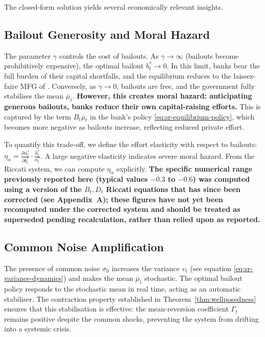 The closed-form solution yields several economically relevant insights.

\subsection{Bailout Generosity and Moral Hazard}

The parameter $\gamma$ controls the cost of bailouts. As $\gamma \to \infty$
(bailouts become prohibitively expensive), the optimal bailout $b_t^* \to 0$. In
this limit, banks bear the full burden of their capital shortfalls, and the
equilibrium reduces to the laissez-faire MFG of \citep{carmonafouquesun2015}.
Conversely, as $\gamma \to 0$, bailouts are free, and the government fully
stabilises the mean $\bar\mu_t$. \textbf{However, this creates moral hazard:
anticipating generous bailouts, banks reduce their own capital-raising efforts.}
This is captured by the term $B_t \bar\mu_t$ in the bank's policy
\eqref{eq:sr-equilibrium-policy}, which becomes more negative as bailouts increase,
reflecting reduced private effort.

To quantify this trade-off, we define the effort elasticity with respect to
bailouts: $\eta_\alpha = \frac{\partial \alpha_t^*}{\partial b_t^*} \cdot
\frac{b_t^*}{\alpha_t^*}$. A large negative elasticity indicates severe moral
hazard. From the Riccati system, we can compute $\eta_\alpha$ explicitly.
\textbf{The specific numerical range previously reported here (typical values
$-0.3$ to $-0.6$) was computed using a version of the $B_t, D_t$ Riccati
equations that has since been corrected (see Appendix~A); these figures have
not yet been recomputed under the corrected system and should be treated as
superseded pending recalculation, rather than relied upon as reported.}

\subsection{Common Noise Amplification}

The presence of common noise $\sigma_0$ increases the variance $v_t$ (see equation
\eqref{eq:sr-variance-dynamics}) and makes the mean $\bar\mu_t$ stochastic. The
optimal bailout policy responds to the stochastic mean in real time, acting as an
automatic stabiliser. The contraction property established in
Theorem~\ref{thm:wellposedness} ensures that this stabilisation is effective: the
mean-reversion coefficient $\Gamma_t$ remains positive despite the common shocks,
preventing the system from drifting into a systemic crisis.

